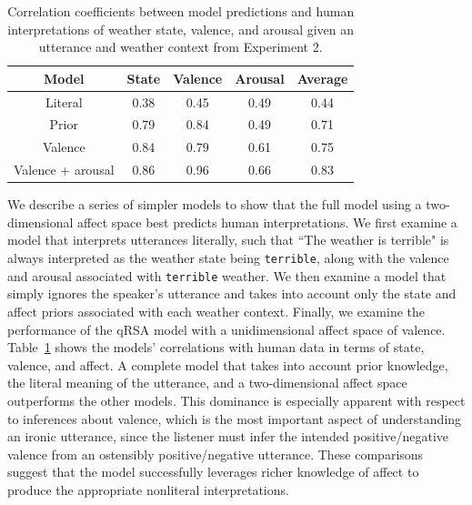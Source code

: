 \documentclass[10pt,letterpaper]{article}
\begin{document}
\begin{table}
\begin{tabular}{ |c | c | c | c | c | }
  \hline
  \textbf{Model} & \textbf{State} & \textbf{Valence} & \textbf{Arousal} & \textbf{Average} \\\hline                        
  Literal & 0.38 & 0.45 & 0.49 & 0.44\\
  Prior & 0.79 & 0.84 & 0.49 &  0.71 \\
  Valence & 0.84 & 0.79 & 0.61 & 0.75 \\
  Valence + arousal & 0.86 & 0.96 & 0.66 & 0.83\\
  \hline 
\end{tabular}
\caption{Correlation coefficients between model predictions and human interpretations of weather state, valence, and arousal given an utterance and weather context from Experiment 2.}
\label{table1}
\end{table}

We describe a series of simpler models to show that the full model using a two-dimensional affect space best predicts human interpretations. We first examine a model that interprets utterances literally, such that ``The weather is terrible" is always interpreted as the weather state being \texttt{terrible}, along with the valence and arousal associated with \texttt{terrible} weather. 
We then examine a model that simply ignores the speaker's utterance and takes into account only the state and affect priors associated with each weather context. 
Finally, we examine the performance of the qRSA model with a unidimensional affect space of valence. 
Table~\ref{table1} shows the models' correlations with human data in terms of state, valence, and affect.
A complete model that takes into account prior knowledge, the literal meaning of the utterance, and a two-dimensional affect space outperforms the other models. This dominance is especially apparent with respect to inferences about valence, which is the most important aspect of understanding an ironic utterance, since the listener must infer the intended positive/negative valence from an ostensibly positive/negative utterance. These comparisons suggest that the model successfully leverages richer knowledge of affect to produce the appropriate nonliteral interpretations.
\end{document}
